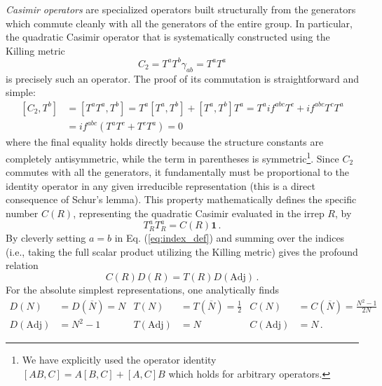 \textit{Casimir operators} are specialized operators built structurally from the generators which commute cleanly with all the generators of the entire group. In particular, the quadratic Casimir operator that is systematically constructed using the Killing metric
\begin{equation} \label{eq:casimir_def}
    C_2 = T^a T^b \gamma_{ab} = T^a T^a
\end{equation}
is precisely such an operator. The proof of its commutation is straightforward and simple:
\[
    \begin{aligned}
        [C_2, T^b] & = [T^a T^a, T^b] = T^a[T^a, T^b] + [T^a, T^b]T^a = T^a i f^{abc} T^c + i f^{abc} T^c T^a \\
                   & = i f^{abc} (T^a T^c + T^c T^a) = 0
    \end{aligned}
\]
where the final equality holds directly because the structure constants are completely antisymmetric, while the term in parentheses is symmetric\footnote{We have explicitly used the operator identity \([AB, C] = A[B, C] + [A, C]B\) which holds for arbitrary operators.}. Since \(C_2\) commutes with all the generators, it fundamentally must be proportional to the identity operator in any given irreducible representation (this is a direct consequence of Schur's lemma). This property mathematically defines the specific number \(C(R)\), representing the quadratic Casimir evaluated in the irrep \(R\), by
\begin{equation} \label{eq:casimir_eigenvalue}
    T_R^a T_R^a = C(R) \mathbf{1} \, .
\end{equation}
By cleverly setting \(a = b\) in Eq. (\ref{eq:index_def}) and summing over the indices (i.e., taking the full scalar product utilizing the Killing metric) gives the profound relation
\begin{equation} \label{eq:index_casimir_relation}
    C(R)D(R) = T(R)D(\mathrm{Adj}) \, .
\end{equation}
For the absolute simplest representations, one analytically finds
\begin{align}
    D(N)            & = D(\overline{N}) = N & T(N)            & = T(\overline{N}) = \frac{1}{2} & C(N)            & = C(\overline{N}) = \frac{N^2 - 1}{2N} \label{eq:fundamental_vals} \\
    D(\mathrm{Adj}) & = N^2 - 1             & T(\mathrm{Adj}) & = N                             & C(\mathrm{Adj}) & = N \, . \label{eq:adjoint_vals}
\end{align}

